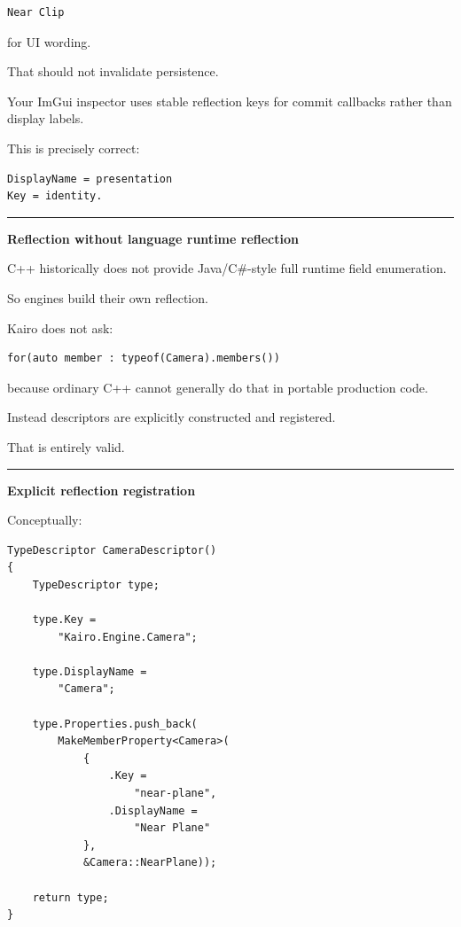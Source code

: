 \begin{verbatim}
Near Clip
\end{verbatim}

for UI wording.

That should not invalidate persistence.

Your ImGui inspector uses stable reflection keys for commit callbacks rather than display labels.

This is precisely correct:

\begin{verbatim}
DisplayName = presentation
Key = identity.
\end{verbatim}

\begin{center}\rule{0.5\linewidth}{0.5pt}\end{center}

\textbf{Reflection without language runtime reflection}

C++ historically does not provide Java/C\#-style full runtime field enumeration.

So engines build their own reflection.

Kairo does not ask:

\begin{verbatim}
for(auto member : typeof(Camera).members())
\end{verbatim}

because ordinary C++ cannot generally do that in portable production code.

Instead descriptors are explicitly constructed and registered.

That is entirely valid.

\begin{center}\rule{0.5\linewidth}{0.5pt}\end{center}

\textbf{Explicit reflection registration}

Conceptually:

\begin{verbatim}
TypeDescriptor CameraDescriptor()
{
    TypeDescriptor type;

    type.Key =
        "Kairo.Engine.Camera";

    type.DisplayName =
        "Camera";

    type.Properties.push_back(
        MakeMemberProperty<Camera>(
            {
                .Key =
                    "near-plane",
                .DisplayName =
                    "Near Plane"
            },
            &Camera::NearPlane));

    return type;
}
\end{verbatim}

